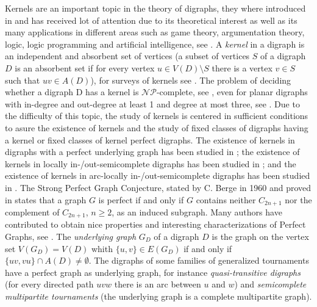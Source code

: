 Kernels are an important topic in the theory of digraphs, they where introduced in \cite{neumann1944theory} and has received lot of attention due to its theoretical interest as well as its many applications in different areas such as game theory, argumentation theory, logic, logic programming and artificial intelligence, see \cite{le2000counterexamples, creignou1995class, dimopoulos1996graph, dung1995acceptability}. A \emph{kernel} in a digraph is an independent and absorbent set of vertices (a subset of vertices $S$ of a digraph $D$ is an absorbent set if for every vertex $u\in V(D)\setminus S$ there is a vertex $v\in S$ such that $uv\in A(D)$), for surveys of kernels see \cite{bang1998generalizations, haynes1998domination}. The problem of deciding  whether a digraph D has a kernel is $\mathcal{NP}$-complete, see \cite{chvatal1973computational}, even for planar digraphs with in-degree and out-degree at least 1 and degree at most three, see \cite{fraenkel1981planar}.
Due to the difficulty of this topic, the study of kernels is centered in sufficient conditions to asure the existence of kernels and the study of fixed classes of digraphs having a kernel or fixed classes of kernel perfect digraphs. The existence of  kernels in digraphs with a perfect underlying graph has been studied in \cite{galeanarojas2006kernels}; the existence of kernels in locally in-/out-semicomplete digraphs has been studied in \cite{galeana1995b1, galeana1997characterization};  and the existence of kernels in arc-locally in-/out-semicomplete digraphs has been studied in \cite{galeana2006kernels}.
%
The Strong Perfect Graph Conjecture,  stated by C. Berge in 1960 and proved in \cite{chudnovsky2006strong} states that a graph $G$ is perfect if and only if $G$ contains neither $C_{2n+1}$ nor the complement of $C_{2n+1}$, $n\geq 2$, as an induced subgraph.
Many authors have contributed to obtain nice properties and interesting characterizations of Perfect Graphs, see \cite{chvatal1984topics,ramirez2001perfect}. 
The \emph{underlying graph} $G_D$ of a digraph $D$ is the graph on the vertex set $V(G_D)=V(D)$ whith $\{u,v\}\in E(G_D)$ if and only if $\{uv,vu\}\cap A(D)\neq \emptyset$.
The digraphs of some families of generalized tournaments have a perfect graph as underlying graph, for instance \emph{quasi-transitive digraphs} (for every directed path $uvw$ there is an arc between $u$ and $w$) and \emph{semicomplete multipartite tournaments} (the underlying graph is a complete multipartite graph).

